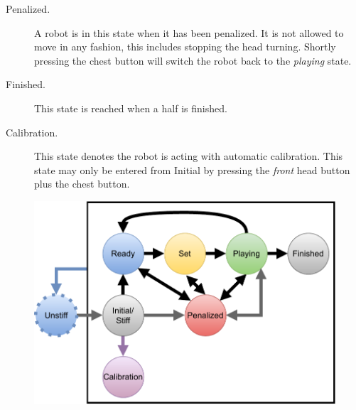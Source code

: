 \begin{description}
	\item[Penalized.] A robot is in this state when it has been penalized. It is not allowed to move in any fashion, this includes stopping the head turning. Shortly pressing the chest button will switch the robot back to the \emph{playing} state.
	
	\item[Finished.] This state is reached when a half is finished. 

   	\item[Calibration.]  This state denotes the robot is acting with automatic calibration. This state may only be entered from Initial by pressing the \textit{front} head button plus the chest button.
    
\end{description}

\begin{figure}[t]
	\centerline{\includegraphics[width=0.9\columnwidth]{figs/states_new.pdf}}
	\caption{}
	\label{fig:robot_states}
\end{figure}

